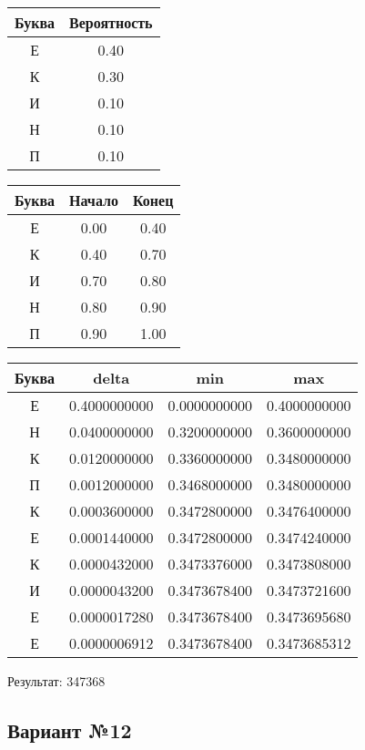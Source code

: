 \documentclass[a4paper, 12pt]{article}
\begin{document}
\begin{center}
 \begin{tabular}{ |c|c| } 
  \hline
     Буква & Вероятность \\ \hline
Е & 0.40\\\hline
К & 0.30\\\hline
И & 0.10\\\hline
Н & 0.10\\\hline
П & 0.10
\\ \hline \end{tabular}
\end{center}
\begin{center}
 \begin{tabular}{ |c|c|c| } 
  \hline
     Буква & Начало & Конец \\ \hline
Е & 0.00 & 0.40\\\hline
К & 0.40 & 0.70\\\hline
И & 0.70 & 0.80\\\hline
Н & 0.80 & 0.90\\\hline
П & 0.90 & 1.00
\\ \hline \end{tabular}
\end{center}
\begin{center}
 \begin{tabular}{ |c|c|c|c| } 
  \hline
     Буква & delta & min & max \\ \hline
Е & 0.4000000000 & 0.0000000000 & 0.4000000000\\\hline
Н & 0.0400000000 & 0.3200000000 & 0.3600000000\\\hline
К & 0.0120000000 & 0.3360000000 & 0.3480000000\\\hline
П & 0.0012000000 & 0.3468000000 & 0.3480000000\\\hline
К & 0.0003600000 & 0.3472800000 & 0.3476400000\\\hline
Е & 0.0001440000 & 0.3472800000 & 0.3474240000\\\hline
К & 0.0000432000 & 0.3473376000 & 0.3473808000\\\hline
И & 0.0000043200 & 0.3473678400 & 0.3473721600\\\hline
Е & 0.0000017280 & 0.3473678400 & 0.3473695680\\\hline
Е & 0.0000006912 & 0.3473678400 & 0.3473685312
\\ \hline \end{tabular}
\end{center}
Результат: 347368
\pagebreak
\subsection{Вариант №12}
\end{document}
